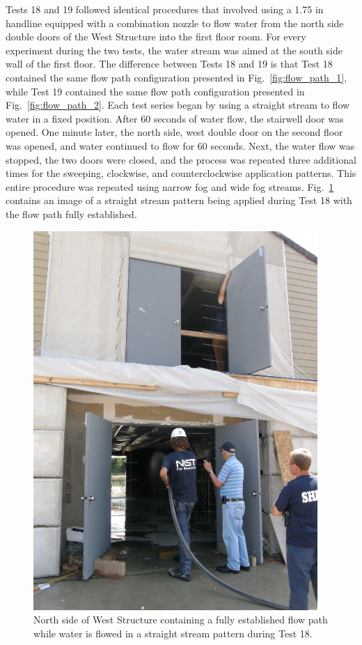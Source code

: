 \documentclass[12pt,oneside]{book}
\begin{document}
Tests 18 and 19 followed identical procedures that involved using a 1.75 in handline equipped with a combination nozzle to flow water from the north side double doors of the West Structure into the first floor room. For every experiment during the two tests, the water stream was aimed at the south side wall of the first floor. The difference between Tests 18 and 19 is that Test 18 contained the same flow path configuration presented in Fig.~\ref{fig:flow_path_1}, while Test 19 contained the same flow path configuration presented in Fig.~\ref{fig:flow_path_2}. Each test series began by using a straight stream to flow water in a fixed position. After 60 seconds of water flow, the stairwell door was opened. One minute later, the north side, west double door on the second floor was opened, and water continued to flow for 60 seconds. Next, the water flow was stopped, the two doors were closed, and the process was repeated three additional times for the sweeping, clockwise, and counterclockwise application patterns. This entire procedure was repeated using narrow fog and wide fog streams. Fig.~\ref{fig:test_18_pic} contains an image of a straight stream pattern being applied during Test 18 with the flow path fully established.

\begin{figure}[!ht]
	\includegraphics[width=4.25in]{../Figures/Pictures/Test_18}
	\caption[North side of West Structure containing a fully established flow path during Test 18.]{North side of West Structure containing a fully established flow path while water is flowed in a straight stream pattern during Test 18.}
	\label{fig:test_18_pic}
\end{figure}
\FloatBarrier
\end{document}
